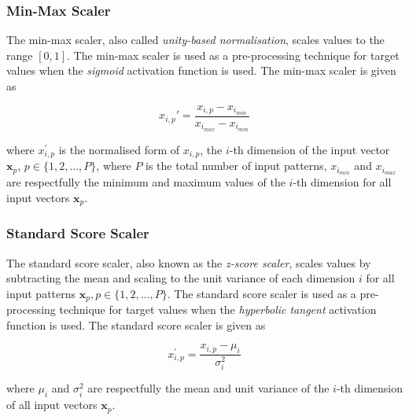 \subsubsection{Min-Max Scaler}\label{sec:anns:an:input:min_max_scaler}

The min-max scaler, also called \textit{unity-based normalisation}, scales values to the range $[0,1]$. The min-max scaler is used as a pre-processing technique for target values when the \textit{sigmoid}  activation function is used. The min-max scaler is given as

\begin{equation}
      x_{i,p}'  = \frac{x_{i,p} - x_{i_{min}}}{x_{i_{max}} - x_{i_{min}}}
      \label{eq:min_max_scaler}
\end{equation}

where $x_{i,p}^{'}$ is the normalised form of $x_{i,p}$, the $i$-th dimension of the input vector $\boldsymbol{x}_p$, $p \in \{1,2, \dots, P \}$, where $P$ is the total number of input patterns, $x_{i_{min}}$ and $x_{i_{max}}$ are respectfully the minimum and maximum values of the $i$-th dimension for all input vectors $\boldsymbol{x}_p$.

\subsubsection{Standard Score Scaler}\label{sec:anns:an:input:standard_score_scaler}

The standard score scaler, also known as the \textit{z-score scaler}, scales values by subtracting the mean and scaling to the unit variance of each dimension $i$ for all input patterns $\boldsymbol{x}_p, p \in \{1,2, \dots, P\}$. The standard score scaler is used as a pre-processing technique for target values when the \textit{hyperbolic tangent} activation function is used. The standard score scaler is given as

\begin{equation}
      x_{i,p}^{'} = \frac{x_{i,p} - \mu_i}{\sigma^2_i}
      \label{eq:standard_score_scaler}
\end{equation}

where $\mu_i$ and $\sigma^2_i$ are respectfully the mean and unit variance of the $i$-th dimension of all input vectors $\boldsymbol{x}_p$.

